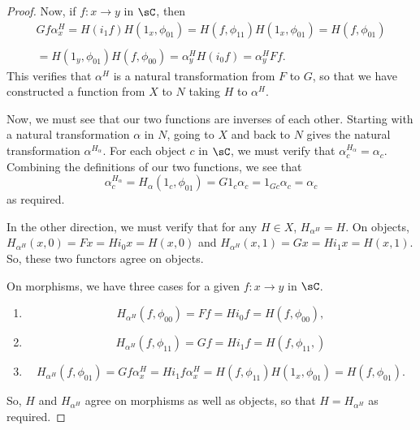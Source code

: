 \documentclass[../../main]{subfiles}
\begin{document}
\begin{proof}
	Now, if $f:x\rightarrow y$ in $\sC$, then
	\[\begin{array}{l}Gf\alpha^H_x=H(i_1f)H(1_x,\phi_{01})=H(f,\phi_{11})
			H(1_x,\phi_{01})=H(f,\phi_{01})\\
	\\=H(1_y,\phi_{01})H(f,\phi_{00})=\alpha^H_yH(i_0f)=\alpha^H_yFf.
	\end{array}\]
	This verifies that $\alpha^H$ is a natural transformation from $F$ to $G$,
	so that we have constructed a function from $X$ to $N$ taking $H$ to
	$\alpha^H$.

	Now, we must see that our two functions are inverses of each other. Starting
	with a natural transformation $\alpha$ in $N$, going to $X$ and back to $N$
	gives the natural transformation $\alpha^{H_\alpha}$. For each object $c$ in
	$\sC$, we must verify that $\alpha^{H_\alpha}_c=\alpha_c$. Combining the
	definitions of our two functions, we see that
	\[\alpha^{H_\alpha}_c=H_\alpha(1_c,\phi_{01})=G1_c\alpha_c=1_{Gc}\alpha_c=\alpha_c\]
	as required.

	In the other direction, we must verify that for any $H\in X$,
	$H_{\alpha^H}=H$. On objects, $H_{\alpha^H}(x,0)=Fx=Hi_0x=H(x,0)$ and
	$H_{\alpha^H}(x,1)=Gx=Hi_1x=H(x,1)$. So, these two functors agree on
	objects.

	On morphisms, we have three cases for a given $f:x\rightarrow y$ in $\sC$.
	\begin{enumerate}
		\item
			\[H_{\alpha^H}(f,\phi_{00})=Ff=Hi_0f=H(f,\phi_{00}),\]
		\item
			\[H_{\alpha^H}(f,\phi_{11})=Gf=Hi_1f=H(f,\phi_{11},)\]
		\item
			\[H_{\alpha^H}(f,\phi_{01})=Gf\alpha^H_x=Hi_1f\alpha^H_x=H(f,\phi_{11})H(1_x,\phi_{01})=H(f,\phi_{01}).\]
	\end{enumerate}
	So, $H$ and $H_{\alpha^H}$ agree on morphisms as well as objects, so that
	$H=H_{\alpha^H}$ as required.
\end{proof}
\end{document}

